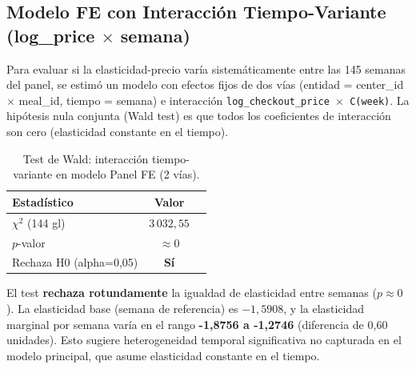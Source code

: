 \documentclass[doc, a4paper, biblatex, floatsintext, longtable, babel]{apa7}
\begin{document}
\subsection{Modelo FE con Interacción Tiempo-Variante (log\_price $\times$ semana)}
\label{subsec:fe_time_varying}

Para evaluar si la elasticidad-precio varía sistemáticamente entre las 145 semanas del panel, se estimó un modelo con efectos fijos de dos vías (entidad = center\_id $\times$ meal\_id, tiempo = semana) e interacción \texttt{log\_checkout\_price $\times$ C(week)}. La hipótesis nula conjunta (Wald test) es que todos los coeficientes de interacción son cero (elasticidad constante en el tiempo).

\begin{table}[!htbp]
\centering
\caption{Test de Wald: interacción tiempo-variante en modelo Panel FE (2 vías).}
\label{tab:fe_time_varying_wald}
\begin{tabular}{lcp{4.5cm}}
\toprule
Estadístico & Valor \\
\midrule
$\chi^2$ (144 gl) & $3\,032,55$ \\
$p$-valor & $\approx 0$ \\
Rechaza H0 (alpha=0,05) & \textbf{Sí} \\
\bottomrule
\end{tabular}
\end{table}

El test \textbf{rechaza rotundamente} la igualdad de elasticidad entre semanas ($p \approx 0$). La elasticidad base (semana de referencia) es $-1,5908$, y la elasticidad marginal por semana varía en el rango \textbf{-1,8756 a -1,2746} (diferencia de 0,60 unidades). Esto sugiere heterogeneidad temporal significativa no capturada en el modelo principal, que asume elasticidad constante en el tiempo.
\end{document}
